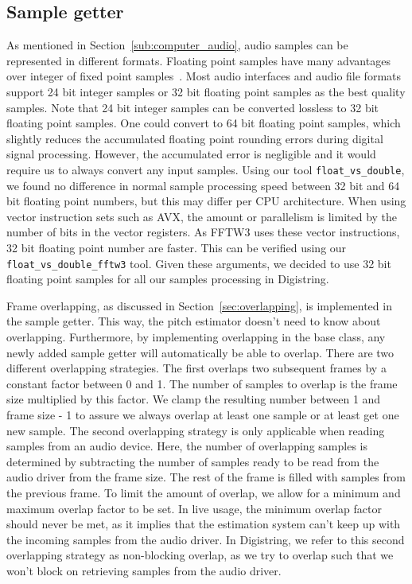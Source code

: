 \documentclass[a4paper,10pt,twocolumn]{article}
\begin{document}
\subsection{Sample getter}  \label{sub:samplegetter}
As mentioned in Section~\ref{sub:computer_audio}, audio samples can be represented in different formats. Floating point samples have many advantages over integer of fixed point samples~\cite{dspfloat}. Most audio interfaces and audio file formats support 24 bit integer samples or 32 bit floating point samples as the best quality samples. Note that 24 bit integer samples can be converted lossless to 32 bit floating point samples. One could convert to 64 bit floating point samples, which slightly reduces the accumulated floating point rounding errors during digital signal processing. However, the accumulated error is negligible and it would require us to always convert any input samples. Using our tool \texttt{float\_vs\_double}, we found no difference in normal sample processing speed between 32 bit and 64 bit floating point numbers, but this may differ per CPU architecture. When using vector instruction sets such as AVX, the amount or parallelism is limited by the number of bits in the vector registers. As FFTW3 uses these vector instructions, 32 bit floating point number are faster. This can be verified using our \texttt{float\_vs\_double\_fftw3} tool. Given these arguments, we decided to use 32 bit floating point samples for all our samples processing in Digistring.

Frame overlapping, as discussed in Section~\ref{sec:overlapping}, is implemented in the sample getter. This way, the pitch estimator doesn't need to know about overlapping. Furthermore, by implementing overlapping in the base class, any newly added sample getter will automatically be able to overlap. There are two different overlapping strategies. The first overlaps two subsequent frames by a constant factor between 0 and 1. The number of samples to overlap is the frame size multiplied by this factor. We clamp the resulting number between 1 and frame size - 1 to assure we always overlap at least one sample or at least get one new sample. The second overlapping strategy is only applicable when reading samples from an audio device. Here, the number of overlapping samples is determined by subtracting the number of samples ready to be read from the audio driver from the frame size. The rest of the frame is filled with samples from the previous frame. To limit the amount of overlap, we allow for a minimum and maximum overlap factor to be set. In live usage, the minimum overlap factor should never be met, as it implies that the estimation system can't keep up with the incoming samples from the audio driver. In Digistring, we refer to this second overlapping strategy as non-blocking overlap, as we try to overlap such that we won't block on retrieving samples from the audio driver.
\end{document}
